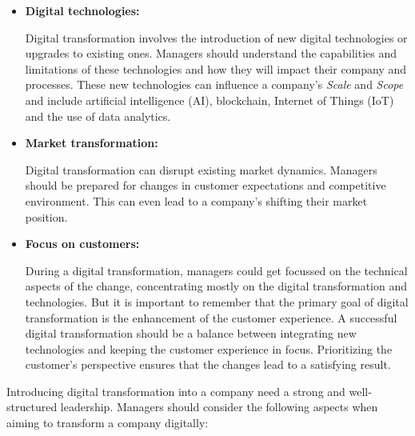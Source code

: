 \documentclass[a4]{scrartcl}
\begin{document}
\begin{itemize}
	
	\item \textbf{Digital technologies:} 
	
	Digital transformation involves the introduction of new digital technologies or upgrades to existing ones. Managers should understand the capabilities and limitations of these technologies and how they will impact their company and processes. These new technologies can influence a company's \textit{Scale} and \textit{Scope} and include artificial intelligence (AI), blockchain, Internet of Things (IoT) and the use of data analytics.~\cite{AI,DDDM, iot, blockchain}
	
	
	\item \textbf{Market transformation:} 
	
	Digital transformation can disrupt existing market dynamics. Managers should be prepared for changes in customer expectations and competitive environment. This can even lead to a company's shifting their market position. \cite{digitalmatrix, vial, DTOT, leadingdigital}
	
	
	\item \textbf{Focus on customers:} 
	
	During a digital transformation, managers could get focussed on the technical aspects of the change, concentrating mostly on the digital transformation and technologies. But it is important to remember that the primary goal of  digital transformation is the enhancement of the customer experience. 
	A successful digital transformation should be a balance between integrating new technologies and keeping the customer experience in focus. Prioritizing the customer's perspective ensures that the changes lead to a satisfying result.~\cite{wiwi}
	
	
\end{itemize}

\newpage	

Introducing digital transformation into a company need a strong and well-structured leadership.
Managers should consider the following aspects when aiming to transform a company digitally:
\end{document}
